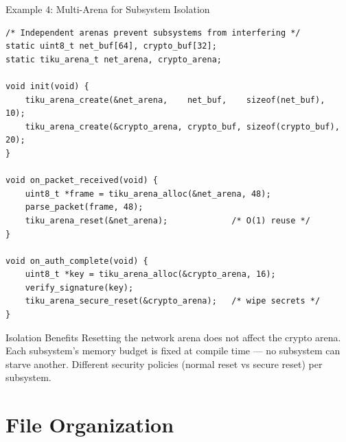 \documentclass[aspectratio=169, 10pt]{beamer}
\begin{document}
\begin{frame}[fragile]{Example 4: Multi-Arena for Subsystem Isolation}
\begin{lstlisting}[style=cstyle]
/* Independent arenas prevent subsystems from interfering */
static uint8_t net_buf[64], crypto_buf[32];
static tiku_arena_t net_arena, crypto_arena;

void init(void) {
    tiku_arena_create(&net_arena,    net_buf,    sizeof(net_buf),    10);
    tiku_arena_create(&crypto_arena, crypto_buf, sizeof(crypto_buf), 20);
}

void on_packet_received(void) {
    uint8_t *frame = tiku_arena_alloc(&net_arena, 48);
    parse_packet(frame, 48);
    tiku_arena_reset(&net_arena);             /* O(1) reuse */
}

void on_auth_complete(void) {
    uint8_t *key = tiku_arena_alloc(&crypto_arena, 16);
    verify_signature(key);
    tiku_arena_secure_reset(&crypto_arena);   /* wipe secrets */
}
\end{lstlisting}

\begin{block}{Isolation Benefits}
Resetting the network arena does not affect the crypto arena.
Each subsystem's memory budget is fixed at compile time ---
no subsystem can starve another. Different security policies
(normal reset vs secure reset) per subsystem.
\end{block}
\end{frame}

\section{File Organization}
\end{document}
